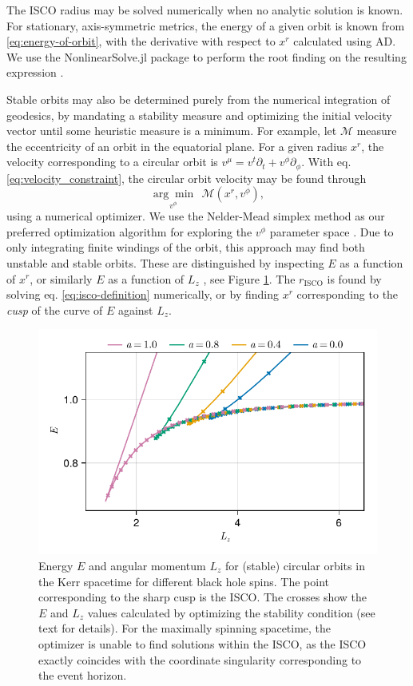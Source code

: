 \documentclass[fleqn,usenatbib]{mnras}
\newcommand{\risco}{r_\text{ISCO}}
\begin{document}
The ISCO radius may be solved numerically when no analytic solution is known.
For stationary, axis-symmetric metrics, the energy of a given orbit is known from
\eqref{eq:energy-of-orbit}, with the derivative with respect to $x^r$
calculated using AD. We use the NonlinearSolve.jl package to perform the root
finding on the resulting expression \citep{Pal_NonlinearSolve_jl_2023}.

Stable orbits may also be determined purely from the numerical integration of
geodesics, by mandating a stability measure and optimizing the initial velocity
vector until some heuristic measure is a minimum. For example, let $\mathscr{M}$
measure the eccentricity of an orbit in the equatorial plane. For a given radius
$x^r$, the velocity corresponding to a circular orbit is $v^\mu = v^t \partial_t
+ v^\phi \partial_\phi $. With eq. \eqref{eq:velocity_constraint}, the circular
orbit velocity may be found through
\begin{equation}
    \underset{v^\phi}{\arg \min}\ \ \mathscr{M}(x^r, v^\phi),
\end{equation}
using a numerical optimizer. We use the Nelder-Mead simplex method as our
preferred optimization algorithm for exploring the $v^\phi$ parameter space
\citep{nelder_simplex_1965}. Due to only integrating finite windings of the
orbit, this approach may find both unstable and stable orbits. These are
distinguished by inspecting $E$ as a function of $x^r$, or similarly $E$ as a
function of $L_z$ \citep{hackmann_charged_2013}, see Figure \ref{fig:e-lz-cusp}.
The $\risco$ is found by solving eq. \eqref{eq:isco-definition} numerically, or
by finding $x^r$ corresponding to the \emph{cusp} of the curve of  $E$ against
$L_z$.

\begin{figure}
    \centering
    \includegraphics[width=0.95\linewidth]{figures/circular-orbits.E-Lz.pdf}
    \caption{Energy $E$ and angular momentum $L_z$ for (stable) circular orbits
        in the Kerr spacetime for different black hole spins. The point
        corresponding to the sharp cusp is the ISCO. The crosses show the $E$
        and $L_z$ values calculated by optimizing the stability condition (see
        text for details). For the maximally spinning spacetime, the optimizer
        is unable to find solutions within the ISCO, as the ISCO exactly
        coincides with the coordinate singularity corresponding to the event
        horizon.}
    \label{fig:e-lz-cusp}
\end{figure}
\end{document}

